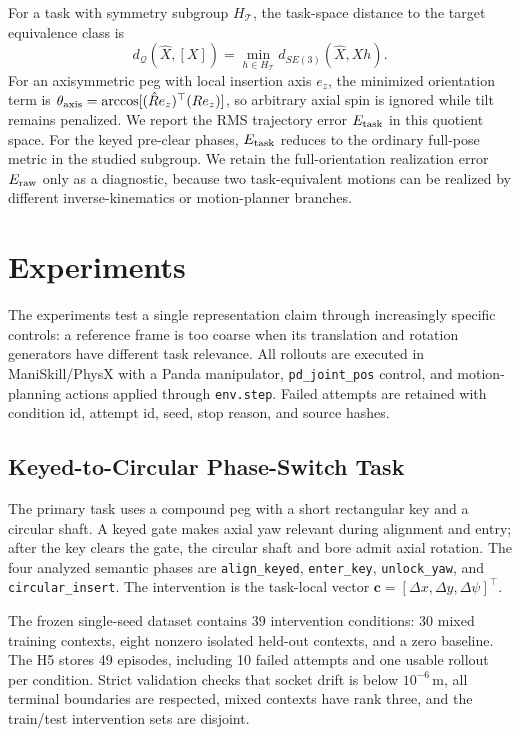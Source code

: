 \documentclass[letterpaper,10pt,conference]{ieeeconf}
\begin{document}
For a task with symmetry subgroup $H_{\mathcal T}$, the task-space distance to
the target equivalence class is
\begin{equation}
    d_{\mathcal Q}
    (\hat X,[X])
    =
    \min_{h\in H_{\mathcal T}}
    d_{SE(3)}(\hat X,Xh).
    \label{eq:qdist}
\end{equation}
For an axisymmetric peg with local insertion axis $e_z$, the minimized
orientation term is
$\theta_{\rm axis}=\arccos[(\hat R e_z)^\top(Re_z)]$, so arbitrary axial spin is
ignored while tilt remains penalized. We report the RMS trajectory error
$E_{\rm task}$ in this quotient space. For the keyed pre-clear phases,
$E_{\rm task}$ reduces to the ordinary full-pose metric in the studied
subgroup.
We retain the full-orientation realization error $E_{\rm raw}$ only as a
diagnostic, because two task-equivalent motions can be realized by different
inverse-kinematics or motion-planner branches.

\section{Experiments}
\label{sec:experiments}

The experiments test a single representation claim through increasingly
specific controls: a reference frame is too coarse when its translation and
rotation generators have different task relevance. All rollouts are executed in
ManiSkill/PhysX with a Panda manipulator, \texttt{pd\_joint\_pos} control, and
motion-planning actions applied through \texttt{env.step}. Failed attempts are
retained with condition id, attempt id, seed, stop reason, and source hashes.

\subsection{Keyed-to-Circular Phase-Switch Task}

The primary task uses a compound peg with a short rectangular key and a
circular shaft. A keyed gate makes axial yaw relevant during alignment and
entry; after the key clears the gate, the circular shaft and bore admit axial
rotation. The four analyzed semantic phases are
\texttt{align\_keyed}, \texttt{enter\_key}, \texttt{unlock\_yaw}, and
\texttt{circular\_insert}. The intervention is the task-local vector
$\bm c=[\Delta x,\Delta y,\Delta\psi]^\top$.

The frozen single-seed dataset contains 39 intervention conditions: 30 mixed
training contexts, eight nonzero isolated held-out contexts, and a zero
baseline. The H5 stores 49 episodes, including 10 failed attempts and one
usable rollout per condition. Strict validation checks that socket drift is
below $10^{-6}$\,m, all terminal boundaries are respected, mixed contexts have
rank three, and the train/test intervention sets are disjoint.
\end{document}
